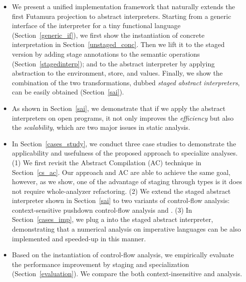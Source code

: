 \begin{itemize}
  \item We present a unified implementation framework that naturally extends the
    first Futamura projection to abstract interpreters. Starting from a generic
    interface of the interpreter for a tiny functional language
    (Section~\ref{generic_if}), we first show the instantiation of concrete
    interpretation in Section~\ref{unstaged_conc}. Then we lift it to the staged
    version by adding stage annotations to the semantic operations
    (Section~\ref{stagedinterp}); and to the abstract interpreter by applying
    abstraction to the environment, store, and values. Finally, we show the
    combination of the two transformations, dubbed \textit{staged abstract
    interpreters}, can be easily obtained (Section~\ref{sai}).
    
  \item {} As shown in Section~\ref{sai}, we demonstrate
    that if we apply the abstract interpreters on open programs, it not only
    improves the \textit{efficiency} but also the \textit{scalability}, which are
    two major issues in static analysis.
    
  \item In Section~\ref{cases_study}, we conduct three case studies to
    demonstrate the applicability and usefulness of the proposed approach to
    specialize analyses.
    (1) We first revisit the Abstract Compilation (AC)
    \cite{Boucher:1996:ACN:647473.727587} technique in Section~\ref{cs_ac}.
    Our approach and AC are able to achieve the same goal, however, as we show,
    one of the advantage of staging through types is it does not require
    whole-analyzer refactoring.
    (2) We extend the staged abstract interpreter shown in Section~\ref{sai} to
    two variants of control-flow analysis: context-sensitive pushdown
    control-flow analysis and .
    (3) In Section~\ref{cases_imp}, we plug a 
     into the staged abstract interpreter, demonstrating that a
    numerical analysis on imperative languages can be also implemented and
    speeded-up in this manner.
    
  \item Based on the instantiation of control-flow analysis, we empirically
    evaluate the performance improvement by staging and specialization
    (Section~\ref{evaluation}). We compare the both context-insensitive and
     analysis.
    
\end{itemize}
